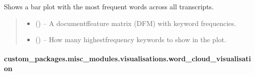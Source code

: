 \documentclass[letterpaper,10pt,english]{sphinxhowto}
\begin{document}
\begin{fulllineitems}
\label{\detokenize{_autosummary/custom_packages.misc_modules.visualisations.plot_word_frequencies:custom_packages.misc_modules.visualisations.plot_word_frequencies}}
\pysigstartsignatures
\pysiglinewithargsret
{}
{\sphinxparamcomma {}}
{}
\pysigstopsignatures
\sphinxAtStartPar
Shows a bar plot with the most frequent words across all transcripts.
\begin{quote}\begin{description}
\begin{itemize}
\item {} 
\sphinxAtStartPar
{} () – A document\sphinxhyphen{}ffeature matrix (DFM) with keyword frequencies.

\item {} 
\sphinxAtStartPar
{} () – How many highest\sphinxhyphen{}frequency keywords to show in the plot.

\end{itemize}

\sphinxAtStartPar
{}

\end{description}\end{quote}

\end{fulllineitems}


\sphinxstepscope


\paragraph{custom\_packages.misc\_modules.visualisations.word\_cloud\_visualisation}
\label{\detokenize{_autosummary/custom_packages.misc_modules.visualisations.word_cloud_visualisation:custom-packages-misc-modules-visualisations-word-cloud-visualisation}}\label{\detokenize{_autosummary/custom_packages.misc_modules.visualisations.word_cloud_visualisation::doc}}
\end{document}
